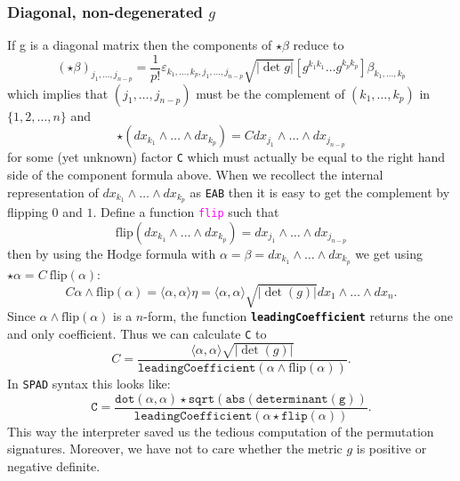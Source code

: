 \documentclass[12pt,a4paper]{article}
\newcommand{\spadfun}[1]{\textcolor{magenta}{\tt #1}}
\newcommand{\spadbold}[1]{{\tt\bf #1}}
\begin{document}
\subsubsection{Diagonal, non-degenerated $g$}
If g is a diagonal matrix then the components of $\star \beta$ reduce to
\begin{displaymath}
(\star \beta)_{j_1, \ldots, j_{n - p}} = \frac{1}{p!} \varepsilon_{k_1,
   \ldots, k_p, j_1, \ldots, j_{n - p}}  \sqrt{| \det g |}  [g^{k_1 k_1}
   \ldots g^{k_p k_p}] \beta_{k_1, \ldots, k_p} 
\end{displaymath}
which implies that $(j_1, \ldots, j_{n - p})$ must be the complement of 
$(k_1,\ldots, k_p)$ in $\{ 1, 2, \ldots, n \}$ and
\begin{displaymath}
  \star (d x_{k_1} \wedge \ldots \wedge d x_{k_p}) = C d x_{j_1} \wedge
   \ldots \wedge d x_{j_{n - p}} 
\end{displaymath}  
for some (yet unknown) factor {\tt C} which must actually be equal to 
the right hand side of the component formula above. When we recollect 
the internal representation of $d x_{k_1} \wedge \ldots \wedge d x_{k_p}$ 
as {\tt EAB} then it is easy to get the complement by flipping
$0$ and $1$. Define a function \spadfun{flip} such that
\begin{displaymath}
  \mathrm{flip} (d x_{k_1} \wedge \ldots \wedge d x_{k_p}) = d x_{j_1} 
  \wedge \ldots \wedge d x_{j_{n - p}}
\end{displaymath}
then by using the Hodge formula with 
$\alpha = \beta = dx_{k_1} \wedge \ldots \wedge d x_{k_p}$ we get using
$\star \alpha = C\ \mathrm{flip} (\alpha)$:
\begin{displaymath}
  C \alpha \wedge \mathrm{flip} (\alpha) = \langle \alpha, \alpha 
  \rangle \eta
   = \langle \alpha, \alpha \rangle \sqrt{| \det (g) |} d x_1 \wedge 
   \ldots\wedge d x_n . 
\end{displaymath}
Since $\alpha \wedge \mathrm{flip} (\alpha)$ is a $n$-form, the function
\spadbold{leadingCoefficient} returns the one and only coefficient. 
Thus we can calculate {\tt C} to
\begin{displaymath}
  C = \frac{\langle \alpha, \alpha \rangle \sqrt{| \det (g)
   |}}{\mathtt{leadingCoefficient} (\alpha \wedge \mathrm{flip} (\alpha))}.
\end{displaymath}
In {\tt SPAD} syntax this looks like:
\begin{displaymath}
 \mathtt{C =}  \frac{\mathtt{dot} (\alpha, \alpha) \star
   \mathtt{sqrt\left(abs\left(\right.determinant\left(g\right)\right)}}
   {\mathtt{leadingCoefficient}
   \left( \alpha \star \mathtt{flip} (\alpha) \right)} .    
\end{displaymath}
This way the interpreter saved us the tedious computation of the permutation
signatures. Moreover, we have not to care whether the metric $g$ is 
positive or negative definite.
%
\end{document}
